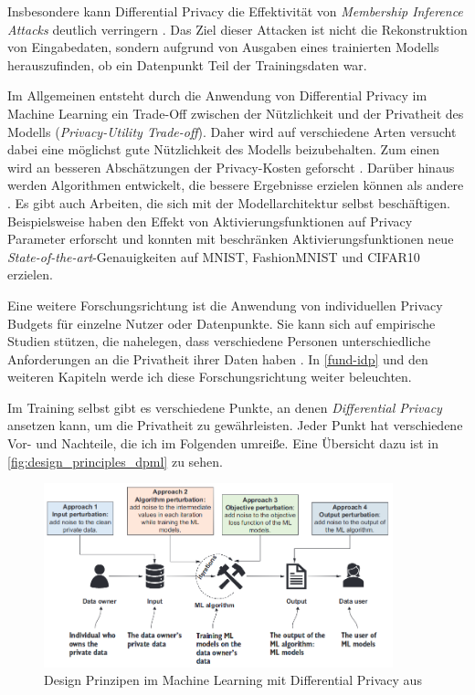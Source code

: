 Insbesondere kann Differential Privacy die Effektivität von \textit{Membership Inference Attacks} \cite{shokri:2017} deutlich verringern \cite[p.14f]{chang:2023}. Das Ziel dieser Attacken ist nicht die Rekonstruktion von Eingabedaten, sondern aufgrund von Ausgaben eines trainierten Modells herauszufinden, ob ein Datenpunkt Teil der Trainingsdaten war.

Im Allgemeinen entsteht durch die Anwendung von Differential Privacy im Machine Learning ein Trade-Off zwischen der Nützlichkeit und der Privatheit des Modells (\textit{Privacy-Utility Trade-off}). Daher wird auf verschiedene Arten versucht dabei eine möglichst gute Nützlichkeit des Modells beizubehalten. Zum einen wird an besseren Abschätzungen der Privacy-Kosten geforscht \cite{dwork:2010, abadi:2016, mironov:2019}. Darüber hinaus werden Algorithmen entwickelt, die bessere Ergebnisse erzielen können als andere \cite{papernot:2017}. Es gibt auch Arbeiten, die sich mit der Modellarchitektur selbst beschäftigen. Beispielsweise haben \textcite{papernot:2021} den Effekt von Aktivierungsfunktionen auf Privacy Parameter erforscht und konnten mit beschränken Aktivierungsfunktionen neue \textit{State-of-the-art}-Genauigkeiten auf MNIST, FashionMNIST und CIFAR10 erzielen.

Eine weitere Forschungsrichtung ist die Anwendung von individuellen Privacy Budgets für einzelne Nutzer oder Datenpunkte. Sie kann sich auf empirische Studien stützen, die nahelegen, dass verschiedene Personen unterschiedliche Anforderungen an die Privatheit ihrer Daten haben \cite{jensen:2005, acquisti:2005}. In \autoref{fund-idp} und den weiteren Kapiteln werde ich diese Forschungsrichtung weiter beleuchten.

Im Training selbst gibt es verschiedene Punkte, an denen \textit{Differential Privacy} ansetzen kann, um die Privatheit zu gewährleisten. Jeder Punkt hat verschiedene Vor- und Nachteile, die ich im Folgenden umreiße. Eine Übersicht dazu ist in \autoref{fig:design_principles_dpml} zu sehen.

\begin{figure}[tb]
	\centering
	\includegraphics[width=0.9\textwidth]{Bilder/design_principles_dpml.png}
	\caption{Design Prinzipen im Machine Learning mit Differential Privacy aus \textcite{chang:2023}}
	\label{fig:design_principles_dpml}
\end{figure}

